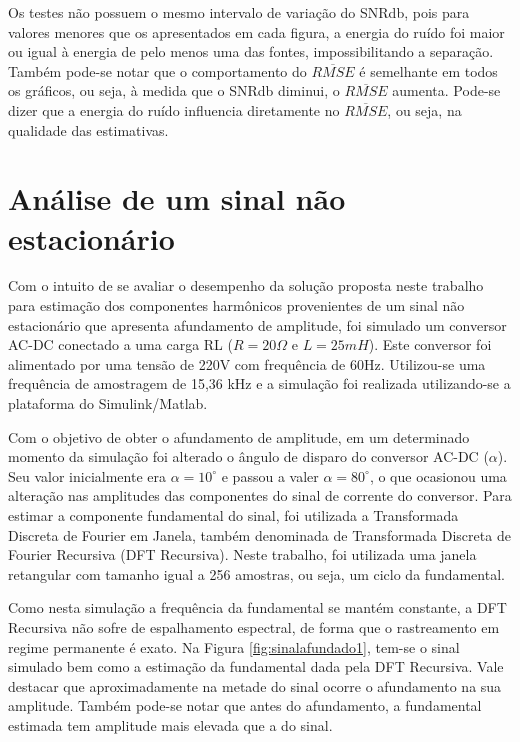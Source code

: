 \documentclass[a4paper,12pt]{monografia}
\theoremstyle{plain}
\theoremstyle{definition}
\theoremstyle{remark}
\begin{document}
Os testes não possuem o mesmo intervalo de variação do SNRdb, pois para valores menores que os apresentados em cada figura, a energia do ruído foi maior ou igual à energia de pelo menos uma das fontes, impossibilitando a separação. Também pode-se notar que o comportamento do $\overline{RMSE}$ é semelhante em todos os gráficos, ou seja, à medida que o SNRdb diminui, o $\overline{RMSE}$ aumenta. Pode-se dizer que a energia do ruído influencia diretamente no $\overline{RMSE}$, ou seja, na qualidade das estimativas. 

\section{Análise de um sinal não estacionário}

Com o intuito de se avaliar o desempenho da solução proposta neste trabalho para estimação dos componentes harmônicos provenientes de um sinal não estacionário que apresenta afundamento de amplitude, foi simulado um conversor AC-DC conectado a uma carga RL ($R = 20\Omega$ e $L  = 25 mH$). Este conversor foi alimentado por uma tensão de 220V com frequência de 60Hz. Utilizou-se uma frequência de amostragem de 15,36 kHz e a simulação foi realizada utilizando-se a plataforma do Simulink/Matlab.

Com o objetivo de obter o afundamento de amplitude, em um determinado momento da simulação foi alterado o ângulo de disparo do conversor AC-DC ($ \alpha $). Seu valor inicialmente era $ \alpha = 10^{\circ}$ e passou a valer $ \alpha = 80^{\circ}$, o que ocasionou uma alteração nas amplitudes das componentes do sinal de corrente do conversor. Para estimar a componente fundamental do sinal, foi utilizada a Transformada Discreta de Fourier em Janela, também denominada de Transformada Discreta de Fourier Recursiva (DFT Recursiva). Neste trabalho, foi utilizada uma janela retangular com tamanho igual a 256 amostras, ou seja, um ciclo da fundamental. 

Como nesta simulação a frequência da fundamental se mantém constante, a DFT Recursiva não sofre de espalhamento espectral, de forma que o rastreamento em regime permanente é exato. Na Figura \ref{fig:sinalafundado1}, tem-se o sinal simulado bem como a estimação da fundamental dada pela DFT Recursiva. Vale destacar que aproximadamente na metade do sinal ocorre o afundamento na sua amplitude. Também pode-se notar que antes do afundamento, a fundamental estimada tem amplitude mais elevada que a do sinal.
\end{document}
